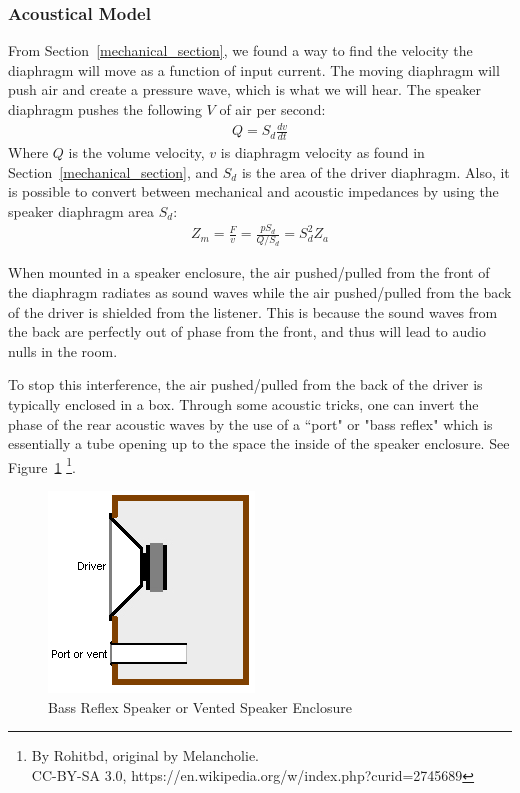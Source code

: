 \documentclass[10pt,letterpaper]{article}
\begin{document}
\subsubsection{Acoustical Model}
From Section~\ref{mechanical_section}, we found a way to find the velocity the diaphragm will move as a function of input current. The moving diaphragm will push air and create a pressure wave, which is what we will hear. The speaker diaphragm pushes the following $V$ of air per second:
\begin{align}
Q=S_d\frac{dv}{dt}
\end{align}
Where $Q$ is the volume velocity, $v$ is diaphragm velocity as found in Section~\ref{mechanical_section}, and $S_d$ is the area of the driver diaphragm. Also, it is possible to convert between mechanical and acoustic impedances by using the speaker diaphragm area $S_d$:
\begin{align}
Z_m=\frac{F}{v}=\frac{pS_d}{Q/S_d}= S_d^2 Z_a
\end{align}

When mounted in a speaker enclosure, the air pushed/pulled from the front of the diaphragm radiates as sound waves while the air pushed/pulled from the back of the driver is shielded from the listener. This is because the sound waves from the back are perfectly out of phase from the front, and thus will lead to audio nulls in the room.

To stop this interference, the air pushed/pulled from the back of the driver is typically enclosed in a box. Through some acoustic tricks, one can invert the phase of the rear acoustic waves by the use of a ``port" or "bass reflex" which is essentially a tube opening up to the space the inside of the speaker enclosure. See Figure~\ref{bass_reflex} \footnote{By Rohitbd, original by Melancholie.\\
CC-BY-SA 3.0, https://en.wikipedia.org/w/index.php?curid=2745689}.

\begin{figure}
\centering
\includegraphics[height=0.25\textheight]{Bass_reflex_spk.png}
\caption{Bass Reflex Speaker or Vented Speaker Enclosure}\label{bass_reflex}
\end{figure}
\end{document}
